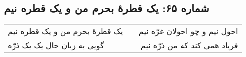 \begin{center}
\section*{شماره ۶۵: یک قطرۀ بحرم من و یک قطره نیم}
\label{sec:065}
\begin{longtable}{l p{0.5cm} r}
یک قطرهٔ بحرم من و یک قطره نیم
&&
احول نیم و چو احولان غرّه نیم
\\
گویی به زبان حال یک یک ذرّه
&&
فریاد همی کند که من ذرّه نیم
\\
\end{longtable}
\end{center}
